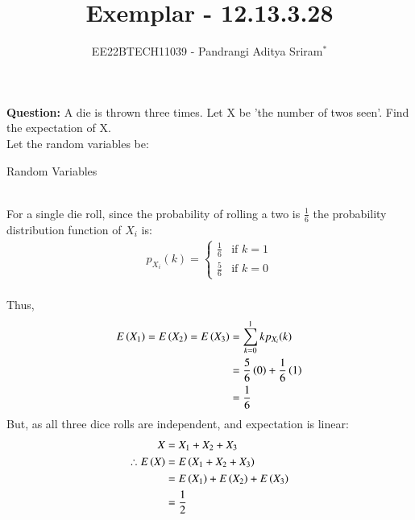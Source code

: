 \documentclass[journal,12pt,twocolumn]{IEEEtran}
\theoremstyle{remark}
\begin{document}

\vspace{3cm}

\title{Exemplar - 12.13.3.28}
\author{EE22BTECH11039 - Pandrangi Aditya Sriram$^{*}$%
}
\maketitle
\newpage
\bigskip

\renewcommand{\thefigure}{\theenumi}
\renewcommand{\thetable}{\theenumi}


\vspace{3cm}
\textbf{Question:} A die is thrown three times. Let X be 'the number of twos seen'. Find the expectation of X.\\
\solution
Let the random variables be:
\begin{table}[h!]
    
    \caption{Random Variables}
    \label{tab:12_13_3_28}
\end{table}\\
For a single die roll, since the probability of rolling a two is $\frac{1}{6}$ the probability distribution function of $X_i$ is:
\begin{align}
    p_{X_i}(k) =
    \begin{cases}
        \frac{1}{6} & \text{if } k = 1\\
        \frac{5}{6} & \text{if } k = 0
    \end{cases}
\end{align}\\
Thus, 
\begin{align}
    E\left(X_1\right) = E\left(X_2\right) = E\left(X_3\right) &= \sum_{k = 0}^{1} k p_{X_i}(k) \\
    &= \frac{5}{6}\left(0\right) + \frac{1}{6}\left(1\right)\\
    &= \frac{1}{6}
\end{align}
But, as all three dice rolls are independent, and expectation is linear:
\begin{align}
    X &= X_1 + X_2 + X_3\\
    \therefore E\left(X\right) &= E\left(X_1 + X_2 + X_3\right)\\
    &= E\left(X_1\right) + E\left(X_2\right) + E\left(X_3\right) \\
    &= \frac{1}{2}
\end{align}
\end{document}
